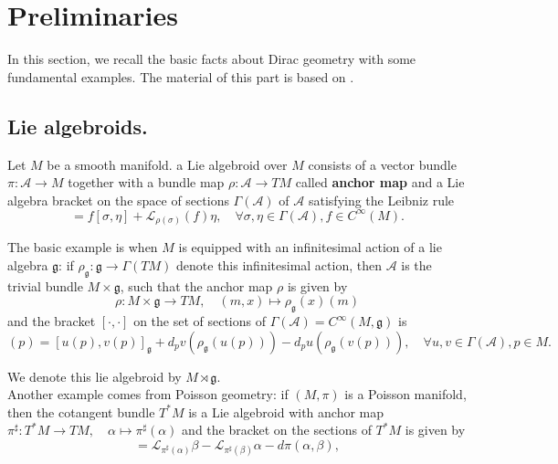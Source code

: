 \documentclass[reqno]{amsart}
\theoremstyle{plain}
\theoremstyle{definition}
\newcommand{\g}{\mathfrak{g}}
\newcommand{\too}{\longrightarrow}
\newcommand{\mtoo}{\longmapsto}
\renewcommand{\L}{\mathcal{L}}
\newcommand{\A}{\mathcal{A}}
\begin{document}
\section{Preliminaries} \label{section 1}
In this section, we recall the basic facts about Dirac geometry with some fundamental examples. The material of this part is based on \cite{bursztyn2005dirac,bursztyn2007dirac}.

\subsection{Lie algebroids.} Let $M$ be a smooth manifold. a Lie algebroid over $M$ consists of a vector bundle $ \pi: \A \too M$ together with a bundle map $\rho: \A \too TM$ called \textbf{anchor map} and a Lie algebra bracket on the space of sections $\Gamma(\A)$ of $\A$ satisfying the Leibniz rule \begin{equation}
    [\sigma,f\eta] = f[\sigma,\eta] + \L_{\rho(\sigma)}(f)\eta, \quad \forall \sigma,\eta \in \Gamma(\A), f \in C^{\infty}(M).
\end{equation}

The basic example is when $M$ is equipped with an infinitesimal action of a lie algebra $\g$: if $\rho_{\g}: \g \too \Gamma(TM)$ denote this infinitesimal action, then $\A$ is the trivial bundle $M\times \g$, such that the anchor map $\rho$ is given by \[ \rho: M\times \g \too TM, \quad (m,x) \mtoo \rho_{\g}(x)(m)\] and the bracket $[\cdot,\cdot]$ on the set of sections of $\Gamma(\A) = C^{\infty}(M,\g)$ is \begin{equation}
    [u,v](p) = [u(p),v(p)]_{\g} + d_{p}v(\rho_{\g}(u(p))) - d_{p}u(\rho_{\g}(v(p))), \quad \forall u,v \in \Gamma(\A), p\in M.
\end{equation}

We denote this lie algebroid by $M \rtimes \g.$\\ 

Another example comes from Poisson geometry: if $(M,\pi)$ is a Poisson manifold, then the cotangent bundle $T^{*}M$ is a Lie algebroid with anchor map $\pi^{\sharp}: T^{*}M \too TM, \quad \alpha \mtoo \pi^{\sharp}(\alpha)$ and the bracket on the sections of $T^{*}M$ is given by \begin{equation}
[\alpha,\beta] = \L_{\pi^{\sharp}(\alpha)}\beta - \L_{\pi^{\sharp}(\beta)}\alpha - d\pi(\alpha,\beta),    
\end{equation}
\end{document}
